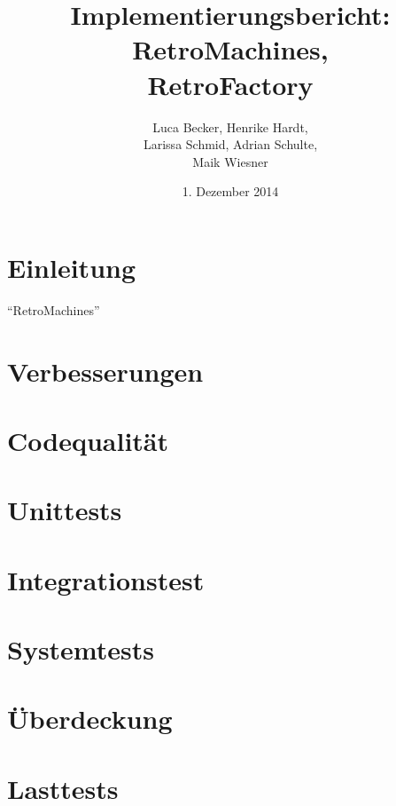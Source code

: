 \documentclass[parskip=full]{scrreprt}
\begin{document}
\title{Implementierungsbericht: RetroMachines, \\ RetroFactory}
\author{Luca Becker, Henrike Hardt,\\Larissa Schmid, Adrian Schulte,\\Maik Wiesner}
\date{1. Dezember 2014}
\maketitle
\thispagestyle{empty}

\clearpage

\thispagestyle{empty}
\tableofcontents
\thispagestyle{empty}

\clearpage
\setcounter{page}{1}

\chapter{Einleitung}

\enquote{RetroMachines}

\chapter{Verbesserungen}

\chapter{Codequalität}

\chapter{Unittests}

\chapter{Integrationstest}

\chapter{Systemtests}

\chapter{Überdeckung}

\chapter{Lasttests}
\end{document}
